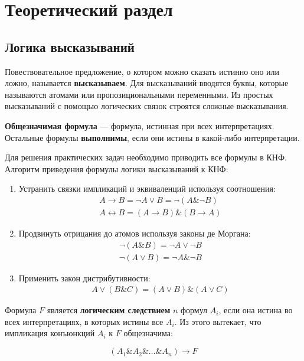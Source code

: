 \chapter{Теоретический раздел}

\section{Логика высказываний}

Повествовательное предложение, о котором можно сказать истинно оно или ложно, называется \textbf{высказываем}. Для высказываний вводятся буквы, которые называются атомами или пропозициональными переменными. Из простых высказываний с помощью логических связок строятся сложные высказывания.

\textbf{Общезначимая формула} --- формула, истинная при всех интерпретациях. Остальные формулы \textbf{выполнимы}, если они истины в какой-либо интерпретации.

Для решения практических задач необходимо приводить все формулы в КНФ. Алгоритм приведения формулы логики высказываний к КНФ:

\begin{enumerate}
    \item Устранить связки импликаций и эквиваленций используя соотношения:
    \begin{eqnarray*}
        A \rightarrow B = \neg A \vee B = \neg (A \& \neg B) \\
        A \leftrightarrow B = (A \rightarrow B) \& (B \rightarrow A)
    \end{eqnarray*}
    \item Продвинуть отрицания до атомов используя законы де Моргана:
    \begin{eqnarray*}
        \neg (A \& B) = \neg A \vee \neg B \\
        \neg (A \vee B) = \neg A \& \neg B
    \end{eqnarray*}
    \item Применить закон дистрибутивности:
    \begin{eqnarray*}
        A \vee (B \& C) = (A \vee B) \& (A \vee C)
    \end{eqnarray*}
\end{enumerate}

Формула $F$ является \textbf{логическим следствием} $n$ формул $A_i$, если она истина во всех интерпретациях, в которых истины все $A_i$. Из этого вытекает, что импликация конъюнкций $A_i$ к $F$ общезначима:

\begin{equation*}
    (A_1 \& A_2 \& \dots \& A_n) \rightarrow F
\end{equation*}

